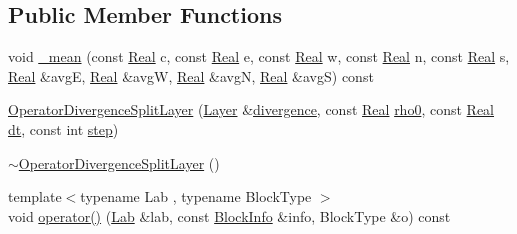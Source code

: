 \subsection*{Public Member Functions}
\begin{DoxyCompactItemize}
\item 
void \hyperlink{struct_operator_divergence_split_layer_a295391ce7409255d79703a289fed4e7b}{\+\_\+mean} (const \hyperlink{_h_d_f5_dumper_8h_a445a5f0e2a34c9d97d69a3c2d1957907}{Real} c, const \hyperlink{_h_d_f5_dumper_8h_a445a5f0e2a34c9d97d69a3c2d1957907}{Real} e, const \hyperlink{_h_d_f5_dumper_8h_a445a5f0e2a34c9d97d69a3c2d1957907}{Real} w, const \hyperlink{_h_d_f5_dumper_8h_a445a5f0e2a34c9d97d69a3c2d1957907}{Real} n, const \hyperlink{_h_d_f5_dumper_8h_a445a5f0e2a34c9d97d69a3c2d1957907}{Real} s, \hyperlink{_h_d_f5_dumper_8h_a445a5f0e2a34c9d97d69a3c2d1957907}{Real} \&avg\+E, \hyperlink{_h_d_f5_dumper_8h_a445a5f0e2a34c9d97d69a3c2d1957907}{Real} \&avg\+W, \hyperlink{_h_d_f5_dumper_8h_a445a5f0e2a34c9d97d69a3c2d1957907}{Real} \&avg\+N, \hyperlink{_h_d_f5_dumper_8h_a445a5f0e2a34c9d97d69a3c2d1957907}{Real} \&avg\+S) const 
\item 
\hyperlink{struct_operator_divergence_split_layer_adb870cc91b9c8ac69230cf5f35b625db}{Operator\+Divergence\+Split\+Layer} (\hyperlink{struct_layer}{Layer} \&\hyperlink{struct_operator_divergence_split_layer_a3a87749be5cb9a36faa6bb9b181eed6a}{divergence}, const \hyperlink{_h_d_f5_dumper_8h_a445a5f0e2a34c9d97d69a3c2d1957907}{Real} \hyperlink{struct_operator_divergence_split_layer_acb5c6d750885812f5d90eca819c596a4}{rho0}, const \hyperlink{_h_d_f5_dumper_8h_a445a5f0e2a34c9d97d69a3c2d1957907}{Real} \hyperlink{struct_operator_divergence_split_layer_a59181ec749701cf53d055a6e75e5486c}{dt}, const int \hyperlink{struct_operator_divergence_split_layer_a40f9ce0dcd01080cc50c0ce22a4a3eb4}{step})
\item 
\hyperlink{struct_operator_divergence_split_layer_a72db398a6d2ecb9ac29b6db752802bda}{$\sim$\+Operator\+Divergence\+Split\+Layer} ()
\item 
{\footnotesize template$<$typename Lab , typename Block\+Type $>$ }\\void \hyperlink{struct_operator_divergence_split_layer_a87a9676b91dbe960ebcb4a00463e4aa6}{operator()} (\hyperlink{_definitions_8h_ad6f951af9a2a6ebc1975404882b34314}{Lab} \&lab, const \hyperlink{struct_block_info}{Block\+Info} \&info, Block\+Type \&o) const 
\end{DoxyCompactItemize}
